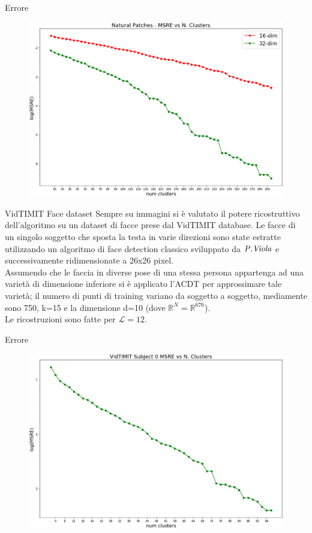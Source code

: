 \documentclass[usenames,dvipsnames,9pt]{beamer}
\newcommand{\RR}{\mathbb{R}}
\theoremstyle{definition}
\begin{document}
\begin{frame}{Errore}
\begin{figure}[b]
\centering
\includegraphics[width=\textwidth]{graphics/naturalpatches.eps}
\end{figure}
\end{frame}

\begin{frame}{VidTIMIT Face dataset}
Sempre su immagini si è valutato il potere ricostruttivo dell'algoritmo su un dataset di facce
prese dal VidTIMIT database. Le facce di un singolo soggetto che sposta la testa in varie direzioni sono
state estratte utilizzando un algoritmo di face detection classico sviluppato da $\it{P.Viola}$ e successivamente
ridimensionate a 26x26 pixel. \\
Assumendo che le faccia in diverse pose di una stessa persona appartenga ad una varietà di dimensione inferiore si è applicato
l'ACDT per approssimare tale varietà; il numero di punti di training variano da soggetto a soggetto, mediamente sono 750,
k=15 e la dimensione d=10 (dove $\RR^{N} = \RR^{676}$). \\
Le ricostruzioni sono fatte per $\mathcal{L}=12$.
\end{frame}

\begin{frame}{Errore}
\begin{figure}[b]
\centering
\includegraphics[width=\textwidth]{graphics/vidtimit_msre.eps}
\end{figure}
\end{frame}
\end{document}
